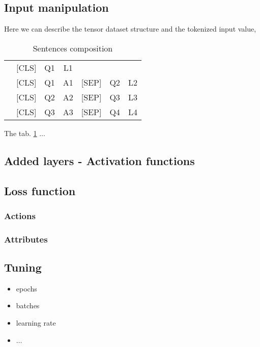 \documentclass[final]{cvpr}
\begin{document}
	\subsection{Input manipulation}
	Here we can describe the tensor dataset structure and the tokenized input value, \eg

	\begin{table}[h]
		\centering

		\begin{tabular}{lcccccc}
			\rowcolor[gray]{0.9}
			& [CLS] & Q1 & L1 & & & \\
			\rowcolor[gray]{0.97}
			& [CLS] & Q1 & A1 & [SEP] & Q2 & L2 \\
			\rowcolor[gray]{0.9}
			& [CLS] & Q2 & A2 & [SEP] & Q3 & L3 \\
			\rowcolor[gray]{0.97}
			& [CLS] & Q3 & A3 & [SEP] & Q4 & L4 \\
		\end{tabular}
		
		\caption{\small{Sentences composition}}
		\label{tab:sentcomp}
	\end{table}

	The tab. \ref{tab:sentcomp} $\ldots$
		
	\subsection{Added layers - Activation functions}
	
	\subsection{Loss function}
	
	\subsubsection{Actions}
	\subsubsection{Attributes}
	
	\subsection{Tuning}
	\begin{itemize}
		\item epochs
		\item batches
		\item learning rate
		\item $\ldots$
	\end{itemize}
\end{document}
